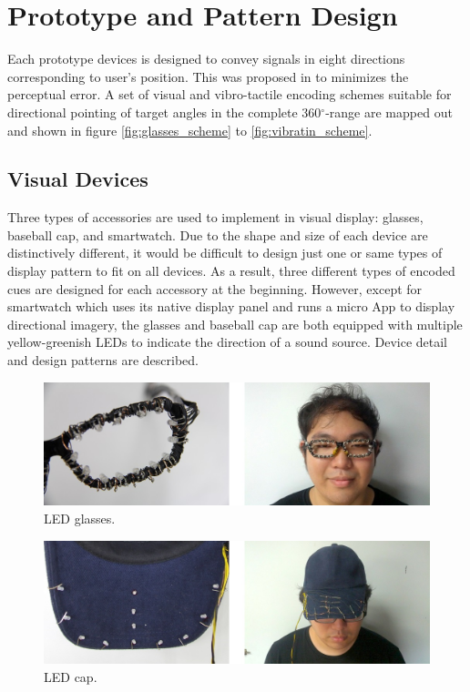 \documentclass{sigchi}
\begin{document}
\section{Prototype and Pattern Design}

Each prototype devices is designed to convey signals in eight directions corresponding to user's position. This was proposed in \cite{Tessendorf2011} to minimizes the perceptual error. A set of visual and vibro-tactile encoding schemes suitable for directional pointing of target angles in the complete 360$^\circ$-range are mapped out and shown in figure \ref{fig:glasses_scheme} to \ref{fig:vibratin_scheme}.

\subsection{Visual Devices}
Three types of accessories are used to implement in visual display: glasses, baseball cap, and smartwatch. Due to the shape and size of each device are distinctively different, it would be difficult to design just one or same types of display pattern to fit on all devices. As a result, three different types of encoded cues are designed for each accessory at the beginning. However, except for smartwatch which uses its native display panel and runs a micro App to display directional imagery, the glasses and baseball cap are both equipped with multiple yellow-greenish LEDs to indicate the direction of a sound source. Device detail and design patterns are described.

\begin{figure}[!b]
\centering
\includegraphics[width=0.9\columnwidth]{glasses_4}
\caption{LED glasses.}
\label{fig:glasses}
\end{figure}

\begin{figure}[!b]
\centering
\includegraphics[width=0.9\columnwidth]{cap_4}
\caption{LED cap.}
\label{fig:cap}
\end{figure}
\end{document}
